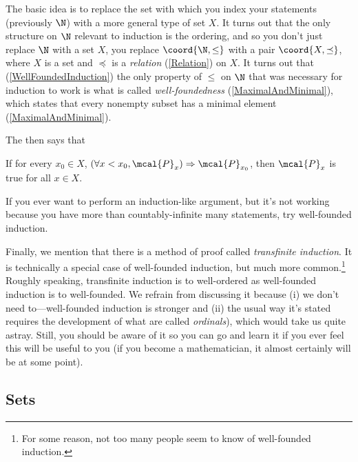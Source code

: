 The basic idea is to replace the set with which you index your statements (previously $\N$) with a more general type of set $X$.  It turns out that the only structure on $\N$ relevant to induction is the ordering, and so you don't just replace $\N$ with a set $X$, you replace $\coord{\N ,\leq}$ with a pair $\coord{X,\preceq}$, where $X$ is a set and $\preceq$ is a \emph{relation} (\cref{Relation}) on $X$.  It turns out that (\cref{WellFoundedInduction}) the only property of $\leq$ on $\N$ that was necessary for induction to work is what is called \emph{well-foundedness} (\cref{MaximalAndMinimal}), which states that every nonempty subset has a minimal element (\cref{MaximalAndMinimal}).

The  then says that
\begin{important}
	If for every $x_0\in X$, $(\forall x<x_0,\mcal{P}_x)\Rightarrow \mcal{P}_{x_0}$, then $\mcal{P}_x$ is true for all $x\in X$.
\end{important}

If you ever want to perform an induction-like argument, but it's not working because you have more than countably-infinite many statements, try well-founded induction.

Finally, we mention that there is a method of proof called \emph{transfinite induction}.  It is technically a special case of well-founded induction, but much more common.\footnote{For some reason, not too many people seem to know of well-founded induction.}  Roughly speaking, transfinite induction is to well-ordered as well-founded induction is to well-founded.  We refrain from discussing it because (i) we don't need to---well-founded induction is stronger and (ii) the usual way it's stated requires the development of what are called \emph{ordinals}), which would take us quite astray.  Still, you should be aware of it so you can go and learn it if you ever feel this will be useful to you (if you become a mathematician, it almost certainly will be at some point).

\subsection{Sets}\label{sbsSets}

